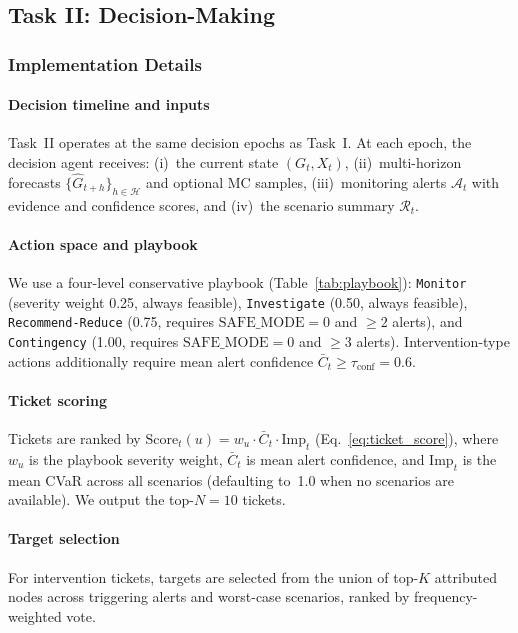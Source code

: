 \subsection{Task II: Decision-Making}

\subsubsection{Implementation Details}
\label{sssec:impl_task2}

\paragraph{Decision timeline and inputs}
Task~II operates at the same decision epochs as Task~I. At each epoch, the decision agent receives: (i)~the current state $(G_t,X_t)$, (ii)~multi-horizon forecasts $\{\widehat{G}_{t+h}\}_{h\in\mathcal{H}}$ and optional MC samples, (iii)~monitoring alerts $\mathcal{A}_t$ with evidence and confidence scores, and (iv)~the scenario summary $\mathcal{R}_t$.

\paragraph{Action space and playbook}
We use a four-level conservative playbook (Table~\ref{tab:playbook}): \texttt{Monitor} (severity weight 0.25, always feasible), \texttt{Investigate} (0.50, always feasible), \texttt{Recommend-Reduce} (0.75, requires $\mathrm{SAFE\_MODE}=0$ and $\ge 2$ alerts), and \texttt{Contingency} (1.00, requires $\mathrm{SAFE\_MODE}=0$ and $\ge 3$ alerts). Intervention-type actions additionally require mean alert confidence $\bar{C}_t \ge \tau_{\mathrm{conf}}=0.6$.

\paragraph{Ticket scoring}
Tickets are ranked by $\mathrm{Score}_t(u) = w_u \cdot \bar{C}_t \cdot \mathrm{Imp}_t$ (Eq.~\eqref{eq:ticket_score}), where $w_u$ is the playbook severity weight, $\bar{C}_t$ is mean alert confidence, and $\mathrm{Imp}_t$ is the mean CVaR across all scenarios (defaulting to~1.0 when no scenarios are available). We output the top-$N=10$ tickets.

\paragraph{Target selection}
For intervention tickets, targets are selected from the union of top-$K$ attributed nodes across triggering alerts and worst-case scenarios, ranked by frequency-weighted vote.

